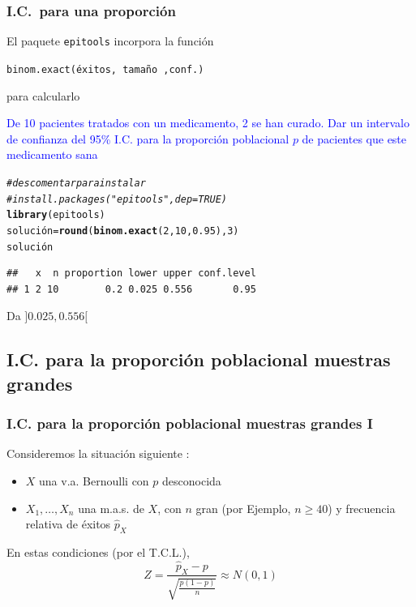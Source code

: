 \documentclass[12pt,t]{beamer}\usepackage[]{graphicx}\usepackage[]{color}
\makeatletter
\newcommand{\hlnum}[1]{\textcolor[rgb]{0.686,0.059,0.569}{#1}}%
\newcommand{\hlcom}[1]{\textcolor[rgb]{0.678,0.584,0.686}{\textit{#1}}}%
\newcommand{\hlstd}[1]{\textcolor[rgb]{0.345,0.345,0.345}{#1}}%
\newcommand{\hlkwb}[1]{\textcolor[rgb]{0.69,0.353,0.396}{#1}}%
\newcommand{\hlkwd}[1]{\textcolor[rgb]{0.737,0.353,0.396}{\textbf{#1}}}%
\newenvironment{kframe}{%
 \def\at@end@of@kframe{}%
 \ifinner\ifhmode%
  \def\at@end@of@kframe{\end{minipage}}%
  \begin{minipage}{\columnwidth}%
 \fi\fi%
 \def\FrameCommand##1{\hskip\@totalleftmargin \hskip-\fboxsep
 \colorbox{shadecolor}{##1}\hskip-\fboxsep
     \hskip-\linewidth \hskip-\@totalleftmargin \hskip\columnwidth}%
 \MakeFramed {\advance\hsize-\width
   \@totalleftmargin\z@ \linewidth\hsize
   \@setminipage}}%
 {\par\unskip\endMakeFramed%
 \at@end@of@kframe}
\newenvironment{knitrout}{}{} %
\newcommand{\blue}[1]{\textcolor{blue}{#1}}
\renewcommand{\geq}{\geqslant}
\theoremstyle{plain}
\theoremstyle{definition}
\makeatother
\begin{document}
\begin{frame}[fragile]
\frametitle{I.C.\ para  una proporción}
\vspace*{-2ex}

El paquete \texttt{epitools} incorpora la función 
\begin{center}
{\tt binom.exact(éxitos, tamaño ,conf.)}
\end{center}
para calcularlo
\medskip

\blue{De 10 pacientes tratados con un medicamento, 2 se han curado. Dar un intervalo de confianza  del 95\% I.C. 
para  la proporción poblacional $p$ de pacientes que este medicamento sana}

\begin{knitrout}\scriptsize
{}\color{fgcolor}\begin{kframe}
\begin{alltt}
\hlcom{#descomentar para instalar}
\hlcom{#install.packages("epitools",dep=TRUE)}
\hlkwd{library}\hlstd{(epitools)}
\hlstd{solución}\hlkwb{=}\hlkwd{round}\hlstd{(}\hlkwd{binom.exact}\hlstd{(}\hlnum{2}\hlstd{,}\hlnum{10}\hlstd{,}\hlnum{0.95}\hlstd{),}\hlnum{3}\hlstd{)}
\hlstd{solución}
\end{alltt}
\begin{verbatim}
##   x  n proportion lower upper conf.level
## 1 2 10        0.2 0.025 0.556       0.95
\end{verbatim}
\end{kframe}
\end{knitrout}

Da $]0.025,0.556[$
\end{frame}

\subsection{I.C. para la proporción poblacional muestras grandes}


\begin{frame}
\frametitle{I.C. para la proporción poblacional muestras grandes I}

Consideremos la situación siguiente  :
\begin{itemize}
\item  $X$ una v.a. Bernoulli con $p$ desconocida

\item $X_1,\ldots,X_n$ una m.a.s. de $X$, con $n$  gran (por Ejemplo, $n\geq 40$) y frecuencia relativa de éxitos $\widehat{p}_{X}$
\end{itemize}
\medskip

En estas  condiciones (por el  T.C.L.), 
$$
Z=\dfrac{\widehat{p}_{X}-p}
{\sqrt{\frac{p(1-p)}{n}}}\approx N(0,1)
$$
\end{frame}
\end{document}
